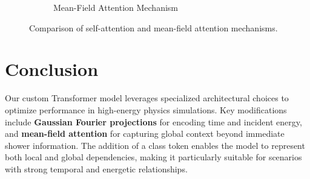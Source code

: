 \begin{figure}[ht]
\begin{subfigure}[b]{0.45\textwidth}
        \caption{Mean-Field Attention Mechanism}
        \label{fig:mean_field_attention}
    \end{subfigure}
    \caption{Comparison of self-attention and mean-field attention mechanisms.}
    \label{fig:attention_comparison}
\end{figure}





\section{Conclusion}
Our custom Transformer model leverages specialized architectural choices to optimize performance in high-energy physics simulations. Key modifications include \textbf{Gaussian Fourier projections} for encoding time and incident energy, and \textbf{mean-field attention} for capturing global context beyond immediate shower information. The addition of a class token enables the model to represent both local and global dependencies, making it particularly suitable for scenarios with strong temporal and energetic relationships.

